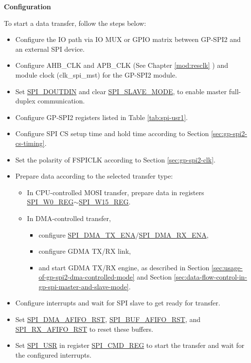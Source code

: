 \documentclass[main\_\_EN.tex]{subfiles}
\begin{document}
\textbf{Configuration}

To start a data transfer, follow the steps below:
\begin{itemize}
    \item Configure the IO path via IO MUX or GPIO matrix between GP-SPI2 and an external SPI device. 
    \item Configure AHB\_CLK and APB\_CLK (See Chapter \ref{mod:resclk} \textit{}) and module clock (clk\_spi\_mst) for the GP-SPI2 module.
    \item Set \hyperref[fielddesc:SPIDOUTDIN]{SPI\_DOUTDIN} and clear \hyperref[fielddesc:SPISLAVEMODE]{SPI\_SLAVE\_MODE}, to enable master full-duplex communication.
    \item Configure GP-SPI2 registers listed in Table \ref{tab:spi-usr1}.
    \item Configure SPI CS setup time and hold time according to Section \ref{sec:gp-spi2-cs-timing}.
    \item Set the polarity of FSPICLK according to Section \ref{sec:gp-spi2-clk}.
    \item Prepare data according to the selected transfer type:
    \begin{itemize}
        \item In CPU-controlled MOSI transfer, prepare data in registers \hyperref[regdesc:SPIW0REG]{SPI\_W0\_REG}$\sim$\hyperref[regdesc:SPIW15REG]{SPI\_W15\_REG}. 
        \item In DMA-controlled transfer, 
        \begin{itemize}
            \item configure \hyperref[fielddesc:SPIDMATXENA]{SPI\_DMA\_TX\_ENA}/\hyperref[fielddesc:SPIDMARXENA]{SPI\_DMA\_RX\_ENA},
            \item configure GDMA TX/RX link,
            \item and start GDMA TX/RX engine, as described in Section \ref{sec:usage-of-gp-spi2-dma-controlled-mode} and Section \ref{sec:data-flow-control-in-gp-spi-master-and-slave-mode}.
        \end{itemize}
    \end{itemize}
    \item Configure interrupts and wait for SPI slave to get ready for transfer.
    \item Set \hyperref[fielddesc:SPIDMAAFIFORST]{SPI\_DMA\_AFIFO\_RST}, \hyperref[fielddesc:SPIBUFAFIFORST]{SPI\_BUF\_AFIFO\_RST}, and \hyperref[fielddesc:SPIRXAFIFORST]{SPI\_RX\_AFIFO\_RST} to reset these buffers.
    \item Set \hyperref[fielddesc:SPIUSR]{SPI\_USR} in register \hyperref[regdesc:SPICMDREG]{SPI\_CMD\_REG} to start the transfer and wait for the configured interrupts.
\end{itemize}
\end{document}

